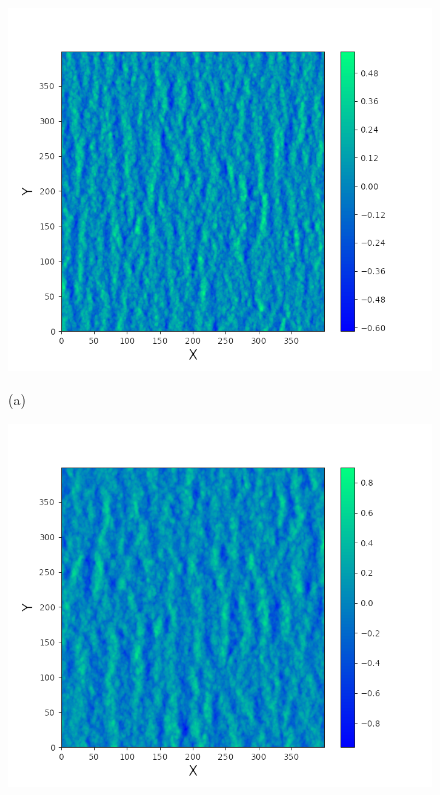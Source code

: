 \documentclass[a4paper,14pt]{extarticle}
\begin{document}
\begin{figure}[h!]
    \begin{minipage}{0.49\linewidth}
        \centering
        \includegraphics[width=\linewidth]{img/water5}

        (a)
    \end{minipage}
    \begin{minipage}{0.49\linewidth}
        \centering
        \includegraphics[width=\linewidth]{img/water6}


\end{minipage}
\end{figure}
\end{document}
